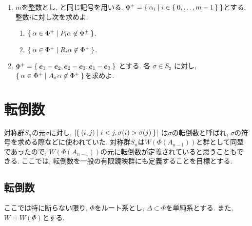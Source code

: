 \begin{enumerate}
\item
  $m$を整数とし,
  と同じ記号を用いる.
  $\Phi^+=\Set{\alpha_i|i\in\Set{0,\ldots,m-1}}$とする.
  整数$i$に対し次を求めよ:
  \begin{enumerate}
  \item $\Set{\alpha\in \Phi^+| P_i\alpha\not\in \Phi^+}$.
  \item $\Set{\alpha\in \Phi^+| R_i\alpha\not\in \Phi^+}$.
  \end{enumerate}
\item
  $\Phi^+=\Set{\boldsymbol{e}_1-\boldsymbol{e}_2,\boldsymbol{e}_2-\boldsymbol{e}_3,\boldsymbol{e}_1-\boldsymbol{e}_3}$
  とする.
  各
  $\sigma\in S_3$
  に対し,
  $\Set{\alpha\in \Phi^+|A_\sigma \alpha \not\in \Phi^{+}}$を求めよ.
\end{enumerate}


\chapter{転倒数}
対称群$S_n$の元$\sigma$に対し,
$\left|\Set{(i,j)|i<j, \sigma(i)>\sigma(j)}\right|$
は$\sigma$の転倒数と呼ばれ,
$\sigma$の符号を求める際などに使われていた.
対称群$S_n$は$W(\Phi(A_{n-1}))$と群として同型であったので,
$W(\Phi(A_{n-1}))$の元に転倒数が定義されていると思うこともできる.
ここでは,
転倒数を一般の有限鏡映群にも定義することを目標とする.


\section{転倒数}
ここでは特に断らない限り,
$\Phi$をルート系とし, $\Delta\subset\Phi$を単純系とする.
また, $W=W(\Phi)$とする.

